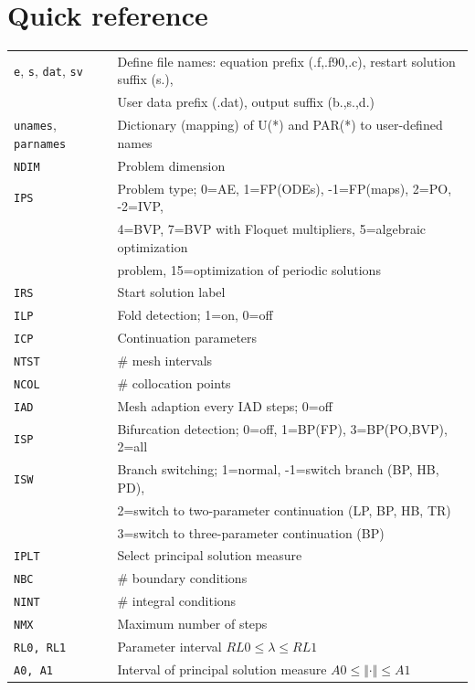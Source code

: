 \documentclass[12pt]{report}
\begin{document}
\section{ Quick reference}
\vspace{-2mm}
\begin{tabular}{|l|l|}
\hline
{\tt e}, {\tt s}, {\tt dat}, {\tt sv} & Define file names: equation
prefix (.f,.f90,.c), restart solution suffix (s.), \\
& User data prefix (.dat), output suffix (b.,s.,d.)\\
\hline
{\tt unames}, {\tt parnames} & Dictionary (mapping) of U(*) and PAR(*)
to user-defined names\\
\hline
{\tt NDIM} & Problem dimension \\
{\tt IPS}  & Problem type; 0=AE, 1=FP(ODEs), -1=FP(maps), 2=PO,
           -2=IVP,\\
           & 4=BVP, 7=BVP with Floquet multipliers, 5=algebraic
           optimization \\
 	   & problem, 15=optimization of periodic solutions \\
{\tt IRS}  & Start solution label \\
{\tt ILP}  & Fold detection; 1=on, 0=off \\
\hline
{\tt ICP}  & Continuation parameters \\
\hline
{\tt NTST} & \# mesh intervals \\
{\tt NCOL} & \# collocation points \\
{\tt IAD} & Mesh adaption every IAD steps; 0=off \\
{\tt ISP} & Bifurcation detection; 0=off, 1=BP(FP), 3=BP(PO,BVP), 2=all \\
{\tt ISW} & Branch switching; 1=normal, -1=switch branch (BP, HB, PD),\\
          & 2=switch to two-parameter continuation (LP, BP, HB, TR) \\
          & 3=switch to three-parameter continuation (BP) \\
{\tt IPLT} & Select principal solution measure \\
{\tt NBC} & \# boundary conditions \\
{\tt NINT} & \# integral conditions \\
\hline
{\tt NMX} & Maximum number of steps \\
{\tt RL0, RL1} & Parameter interval $ RL0 \leq \lambda \leq RL1$ \\
{\tt A0, A1} & Interval of principal solution measure $ A0 \leq
\Vert\cdot\Vert \leq A1$ \\

\end{tabular}
\end{document}
